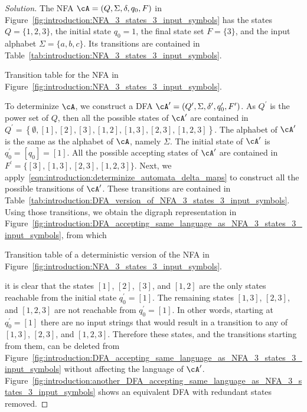 \begin{proof}[Solution]
The NFA $\cA = (Q, \Sigma, \delta, q_0, F)$ in
Figure~\ref{fig:introduction:NFA_3_states_3_input_symbols} has the
states $Q = \{1, 2, 3\}$, the initial state $q_0 = 1$, the final state
set $F = \{3\}$, and the input alphabet $\Sigma = \{a, b, c\}$. Its
transitions are contained in
Table~\ref{tab:introduction:NFA_3_states_3_input_symbols}.
\begin{table}[!htbp]
\centering

\caption{Transition table for the NFA in
  Figure~\ref{fig:introduction:NFA_3_states_3_input_symbols}.}
\label{tab:introduction:NFA_3_states_3_input_symbols}
\end{table}
To determinize $\cA$, we construct a DFA
$
\cA^\prime
=
(Q^\prime, \Sigma, \delta^\prime, q_0^\prime, F^\prime)
$. As $Q^\prime$ is the power set of $Q$, then all the possible states
of $\cA^\prime$ are contained in
$
Q^\prime
=
\left\{
  \emptyset, [1], [2], [3], [1,2], [1,3], [2,3], [1,2,3]
\right\}$.
The alphabet of $\cA^\prime$ is the same as the alphabet of $\cA$,
namely $\Sigma$. The initial state of
$\cA^\prime$ is $q_0^\prime = [q_0] = [1]$. All the possible accepting
states of $\cA^\prime$ are contained in
$F^\prime = \{[3], [1,3], [2,3], [1,2,3]\}$. Next, we
apply~\eqref{eqn:introduction:determinize_automata_delta_maps} to
construct all the possible transitions of $\cA^\prime$. These
transitions are contained in
Table~\ref{tab:introduction:DFA_version_of_NFA_3_states_3_input_symbols}.
Using those transitions, we obtain the digraph representation in
Figure~\ref{fig:introduction:DFA_accepting_same_language_as_NFA_3_states_3_input_symbols},
from which
\begin{table}[!htbp]
\centering

\caption{Transition table of a deterministic version of the
  NFA in Figure~\ref{fig:introduction:NFA_3_states_3_input_symbols}.}
\label{tab:introduction:DFA_version_of_NFA_3_states_3_input_symbols}
\end{table}
it is clear that the states $[1]$, $[2]$, $[3]$, and $[1,2]$ are the
only states reachable from the initial state $q_0^\prime = [1]$. The
remaining states $[1,3]$, $[2,3]$, and $[1,2,3]$ are not reachable from
$q_0^\prime = [1]$. In other words, starting at
$q_0^\prime = [1]$ there are no input strings that would result in a
transition to any of $[1,3]$, $[2,3]$, and $[1,2,3]$. Therefore these
states, and the transitions starting from them, can be deleted from
Figure~\ref{fig:introduction:DFA_accepting_same_language_as_NFA_3_states_3_input_symbols}
without affecting the language of $\cA^\prime$.
Figure~\ref{fig:introduction:another_DFA_accepting_same_language_as_NFA_3_states_3_input_symbols}
shows an equivalent DFA with redundant states removed.
\end{proof}

